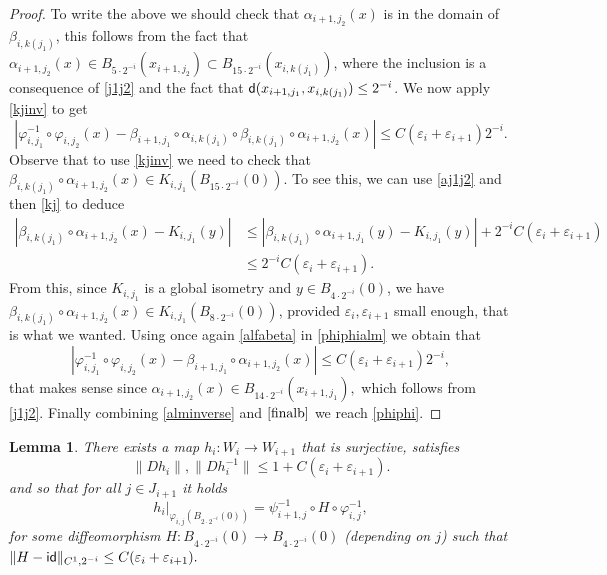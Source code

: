 \documentclass[11pt]{article}
\newcommand{\eps}{\varepsilon}
\newcommand{\sfd}{{\sf d}}
\renewcommand{\phi}{\varphi}
\theoremstyle{plain}
\newtheorem{lemma}[theorem]{Lemma}
\theoremstyle{definition}
\numberwithin{equation}{section}
\begin{document}
\begin{proof}
	To write the above we should check that $\alpha_{i+1,j_2}(x)$ is in the domain of $\beta_{i,k(j_1)}$, this follows from the fact that $\alpha_{i+1,j_2}(x) \in B_{5\cdot 2^{-i}}(x_{i+1,j_2})\subset B_{15 \cdot 2^{-i}}(x_{i,k(j_1)})$,	where the inclusion is  a consequence of \eqref{j1j2} and the fact that $\sfd(x_{i+1,j_1},x_{i,k(j_1)})\le 2^{-i}$. We now apply \eqref{kjinv} to get
	\begin{equation}\label{phiphialm}
		|\phi_{i,j_1}^{-1}\circ \phi_{i,j_2}(x)-  \beta_{i+1,j_1}\circ \alpha_{i,k(j_1)}\circ \beta_{i,k(j_1)}\circ \alpha_{i+1,j_2}(x)|\le C(\eps_i+\eps_{i+1})2^{-i}.
	\end{equation}
	Observe that to use \eqref{kjinv} we need to check that $\beta_{i,k(j_1)}\circ \alpha_{i+1,j_2}(x)\in K_{i,j_1}(B_{15\cdot 2^{-i}}(0))$. To see this, we can use  \eqref{aj1j2} and then \eqref{kj} to deduce
	\begin{align*}
		|\beta_{i,k(j_1)}\circ \alpha_{i+1,j_2}(x)-K_{i,j_1}(y)|&\le |\beta_{i,k(j_1)}\circ \alpha_{i+1,j_1}(y)-K_{i,j_1}(y)|+ 2^{-i}C(\eps_i+\eps_{i+1})\\
		&\le 2^{-i}C(\eps_i+\eps_{i+1}).
	\end{align*}
	From this, since $K_{i,j_1}$ is a global isometry and $y \in B_{4\cdot 2^{-i}}(0)$, we have $\beta_{i,k(j_1)}\circ \alpha_{i+1,j_2}(x)\in K_{i,j_1}(B_{8\cdot 2^{-i}}(0))$, provided $\eps_i,\eps_{i+1}$ small enough, that is what we wanted.
	Using once again \eqref{alfabeta} in \eqref{phiphialm} we obtain that 
	\[|\phi_{i,j_1}^{-1}\circ \phi_{i,j_2}(x)-  \beta_{i+1,j_1}\circ\alpha_{i+1,j_2}(x)|\le C(\eps_i+\eps_{i+1})2^{-i},\]
	that makes sense since $\alpha_{i+1,j_2}(x)\in B_{14 \cdot 2^{-i}}(x_{i+1,j_1}),$ which follows from \eqref{j1j2}.
	Finally combining \eqref{alminverse} and $\eqref{finalb}$ we reach \eqref{phiphi}.
	
\end{proof}




\begin{lemma}\label{hmaps}
	There exists a map $h_i : W_i \to W_{i+1}$ that is surjective, satisfies
	\begin{equation}\label{diffeobound}
	\|Dh_i\|,  \|Dh_i^{-1}\|\le1+C(\eps_i+\eps_{i+1}).
	\end{equation}
	and so that for all $j \in J_{i+1}$ it holds
	\begin{equation}\label{localh}
		h_i|_{\phi_{i,j}(B_{2 \cdot 2^{-i}}(0))}=\psi_{i+1,j}^{-1} \circ H \circ \phi_{i,j}^{-1},
	\end{equation}
	for some diffeomorphism $H: B_{4\cdot 2^{-i}}(0) \to B_{4\cdot 2^{-i}}(0)$  (depending on $j$) such that $\|H-{\sf{id}} \|_{C^1,2^{-i}}\le C(\eps_i+\eps_{i+1}).$
\end{lemma}
\end{document}
